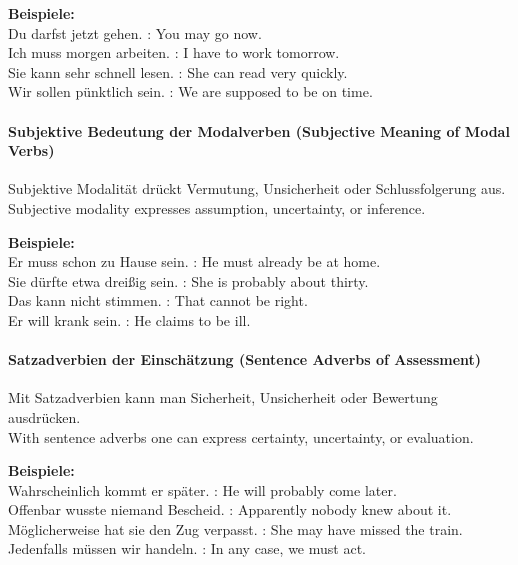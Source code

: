 \documentclass[a4paper]{article}
\begin{document}
            \textbf{Beispiele:}\\
            Du darfst jetzt gehen. : You may go now.\\
            Ich muss morgen arbeiten. : I have to work tomorrow.\\
            Sie kann sehr schnell lesen. : She can read very quickly.\\
            Wir sollen pünktlich sein. : We are supposed to be on time.
        
        \paragraph{Subjektive Bedeutung der Modalverben {\small (Subjective Meaning of Modal Verbs)}}
            Subjektive Modalität drückt Vermutung, Unsicherheit oder Schlussfolgerung aus.\\
            Subjective modality expresses assumption, uncertainty, or inference.
            
            \textbf{Beispiele:}\\
            Er muss schon zu Hause sein. : He must already be at home.\\
            Sie dürfte etwa dreißig sein. : She is probably about thirty.\\
            Das kann nicht stimmen. : That cannot be right.\\
            Er will krank sein. : He claims to be ill.
        
        \paragraph{Satzadverbien der Einschätzung {\small (Sentence Adverbs of Assessment)}}
            Mit Satzadverbien kann man Sicherheit, Unsicherheit oder Bewertung ausdrücken.\\
            With sentence adverbs one can express certainty, uncertainty, or evaluation.
            
            \textbf{Beispiele:}\\
            Wahrscheinlich kommt er später. : He will probably come later.\\
            Offenbar wusste niemand Bescheid. : Apparently nobody knew about it.\\
            Möglicherweise hat sie den Zug verpasst. : She may have missed the train.\\
            Jedenfalls müssen wir handeln. : In any case, we must act.
    
\end{document}
